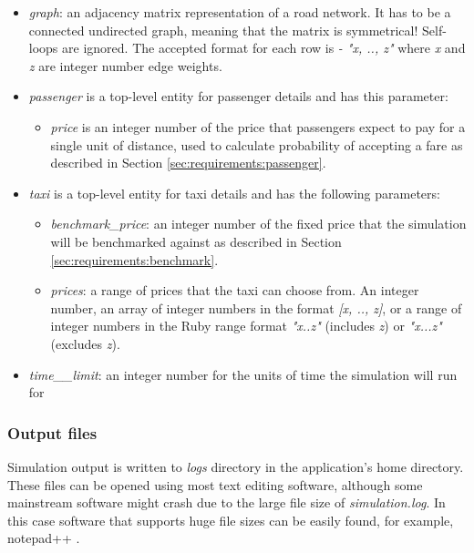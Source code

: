 \begin{itemize}
  \item \textit{graph}: an adjacency matrix representation of a road network.
        It has to be a connected undirected graph, meaning that the matrix is
        symmetrical! Self-loops are ignored. The accepted format for each row
        is \textit{- "x, .., z"} where \textit{x} and \textit{z} are integer
        number edge weights.
  \item \textit{passenger} is a top-level entity for passenger details and has
        this parameter:
        \begin{itemize} 
          \item \textit{price} is an integer number of the price that
                passengers expect to pay for a single unit of distance, used to
                calculate probability of accepting a fare as described in
                Section \ref{sec:requirements:passenger}.
        \end{itemize}
  \item \textit{taxi} is a top-level entity for taxi details and has the
        following parameters:
        \begin{itemize}
          \item \textit{benchmark_price}: an integer number of the fixed price
          that the simulation will be benchmarked against as described in
          Section \ref{sec:requirements:benchmark}.
          \item \textit{prices}: a range of prices that the taxi can choose
          from. An integer number, an array of integer numbers in the format 
          \textit{[x, .., z]}, or a range of integer numbers in the Ruby range
          format \textit{"x..z"} (includes \textit{z}) or \textit{"x...z"}
          (excludes \textit{z}).
        \end{itemize}
  \item \textit{time__limit}: an integer number for the units of time the
        simulation will run for
\end{itemize}


\subsubsection{Output files}

 Simulation output is written to \textit{logs}
directory in the application's home directory. These files can be opened using
most text editing software, although some mainstream software might crash due
to the large file size of \textit{simulation.log}. In this case software that
supports huge file sizes can be easily found, for example, notepad++
\parencite{Notepad++}.

